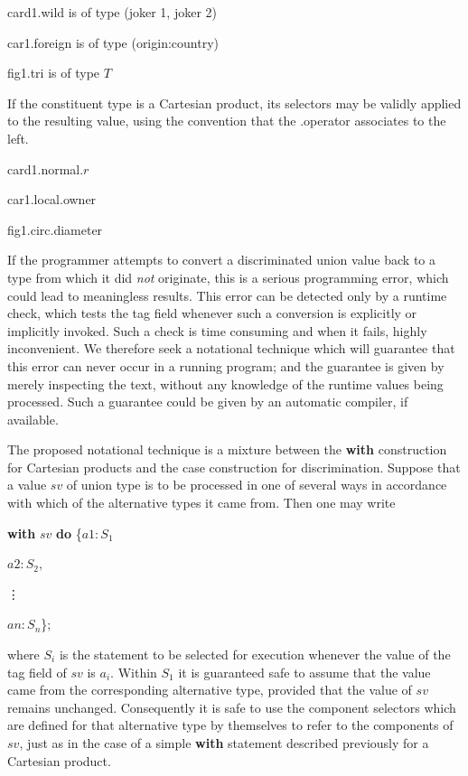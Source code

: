 card1.wild \tabto*{8em} is of type (joker 1, joker 2)

car1.foreign \tabto*{8em} is of type (origin:country)

fig1.tri \tabto*{8em} is of type $T$

\noindent
If the constituent type is a Cartesian product, its selectors may be validly applied to the resulting value, using the convention that the .operator associates to the left.

\quad card1.normal.$r$

\quad car1.local.owner

\quad fig1.circ.diameter

If the programmer attempts to convert a discriminated union value back to a type from which it did \textit{not} originate, this is a serious programming
error, which could lead to meaningless results. This error can be detected only by a runtime check, which tests the tag field whenever such a conversion is explicitly or implicitly invoked. Such a check is time consuming and when it fails, highly inconvenient. We therefore seek a notational technique which will guarantee that this error can never occur in a running program; and the guarantee is given by merely inspecting the text, without any knowledge of the runtime values being processed. Such a guarantee could be given by an automatic compiler, if available.

The proposed notational technique is a mixture between the \textbf{with} construction for Cartesian products and the case construction for discrimination. Suppose that a value $sv$ of union type is to be processed in one of several ways in accordance with which of the alternative types it came from. Then one may write

\quad \textbf{with} $sv$ \textbf{do} \{$a1:S_1$

\tabto*{7.6em}$a2:S_2$,
\smallskip

\tabto*{8.85em}\vdots

\tabto*{7.6em}$an:S_n$\};

\noindent
where $S_i$ is the statement to be selected for execution whenever the value of the tag field of $sv$ is $a_i$. Within $S_1$ it is guaranteed safe to assume that the value came from the corresponding alternative type, provided that the value of $sv$ remains unchanged. Consequently it is safe to use the component selectors which are defined for that alternative type by themselves to refer to the components of $sv$, just as in the case of a simple \textbf{with} statement described previously for a Cartesian product.

